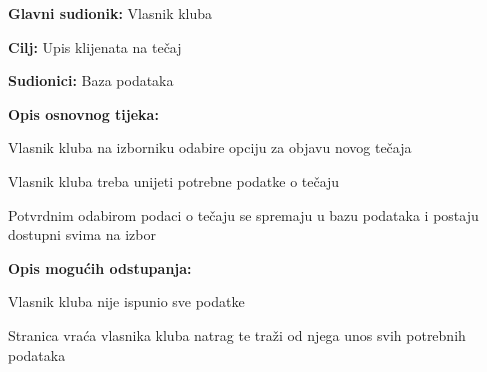 					\noindent {}
					\begin{packed_item}
	
						\item \textbf{Glavni sudionik: }Vlasnik kluba
						\item  \textbf{Cilj:} Upis klijenata na tečaj
						\item  \textbf{Sudionici:} Baza podataka
						\item  \textbf{Opis osnovnog tijeka:}
						
						\item[] \begin{packed_enum}
	
							\item Vlasnik kluba na izborniku odabire opciju za objavu novog tečaja
							\item Vlasnik kluba treba unijeti potrebne podatke o tečaju
							\item Potvrdnim odabirom podaci o tečaju se spremaju u bazu podataka i postaju dostupni svima na izbor
						\end{packed_enum}
						
						\item  \textbf{Opis mogućih odstupanja:}
						
						\item[] \begin{packed_item}
	
							\item[2.a] Vlasnik kluba nije ispunio sve podatke
							\item[] \begin{packed_enum}
								
								\item Stranica vraća vlasnika kluba natrag te traži od njega unos svih potrebnih podataka
								
							\end{packed_enum}							
						\end{packed_item}
					\end{packed_item}

